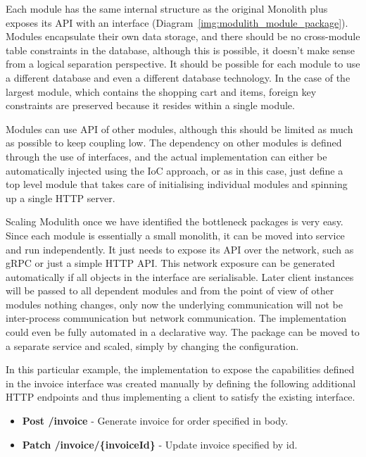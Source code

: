 Each module has the same internal structure as the original Monolith plus exposes its API with an interface (Diagram~\ref{img:modulith_module_package}). Modules encapsulate their own data storage, and there should be no cross-module table constraints in the database, although this is possible, it doesn't make sense from a logical separation perspective. It should be possible for each module to use a different database and even a different database technology. In the case of the largest module, which contains the shopping cart and items, foreign key constraints are preserved because it resides within a single module.

Modules can use API of other modules, although this should be limited as much as possible to keep coupling low. The dependency on other modules is defined through the use of interfaces, and the actual implementation can either be automatically injected using the IoC approach, or as in this case, just define a top level module that takes care of initialising individual modules and spinning up a single HTTP server.

Scaling Modulith once we have identified the bottleneck packages is very easy. Since each module is essentially a small monolith, it can be moved into service and run independently. It just needs to expose its API over the network, such as gRPC or just a simple HTTP API. This network exposure can be generated automatically if all objects in the interface are serialisable. Later client instances will be passed to all dependent modules and from the point of view of other modules nothing changes, only now the underlying communication will not be inter-process communication but network communication. The implementation could even be fully automated in a declarative way. The package can be moved to a separate service and scaled, simply by changing the configuration.

In this particular example, the implementation to expose the capabilities defined in the invoice interface was created manually by defining the following additional HTTP endpoints and thus implementing a client to satisfy the existing interface.

\begin{itemize}
    \item \textbf{Post /invoice} - Generate invoice for order specified in body.
    \item \textbf{Patch /invoice/\{invoiceId\}} - Update invoice specified by id.
\end{itemize}

